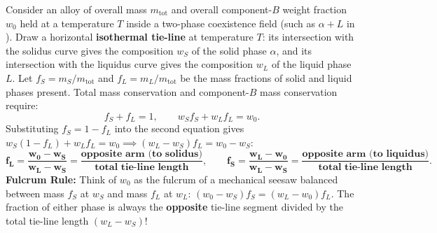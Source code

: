 \begin{derivation}
Consider an alloy of overall mass $m_{\mathrm{tot}}$ and overall component-$B$ weight fraction $w_0$ held at a temperature $T$ inside a two-phase coexistence field (such as $\alpha + L$ in ). Draw a horizontal \textbf{isothermal tie-line} at temperature $T$: its intersection with the solidus curve gives the composition $w_S$ of the solid phase $\alpha$, and its intersection with the liquidus curve gives the composition $w_L$ of the liquid phase $L$. Let $f_S = m_S/m_{\mathrm{tot}}$ and $f_L = m_L/m_{\mathrm{tot}}$ be the mass fractions of solid and liquid phases present. Total mass conservation and component-$B$ mass conservation require:
\begin{equation}\label{eq:05:leverproof}
  f_S + f_L = 1, \qquad w_S f_S + w_L f_L = w_0.
\end{equation}
Substituting $f_S = 1 - f_L$ into the second equation gives $w_S(1 - f_L) + w_L f_L = w_0 \implies (w_L - w_S)f_L = w_0 - w_S$:
\begin{equation}\label{eq:05:eutecticlever}
  \mathbf{f_L = \frac{w_0 - w_S}{w_L - w_S} = \frac{\text{opposite arm (to solidus)}}{\text{total tie-line length}}}, \qquad
  \mathbf{f_S = \frac{w_L - w_0}{w_L - w_S} = \frac{\text{opposite arm (to liquidus)}}{\text{total tie-line length}}}.
\end{equation}
\textbf{Fulcrum Rule:} Think of $w_0$ as the fulcrum of a mechanical seesaw balanced between mass $f_S$ at $w_S$ and mass $f_L$ at $w_L$: $(w_0 - w_S)f_S = (w_L - w_0)f_L$. The fraction of either phase is always the \textbf{opposite} tie-line segment divided by the total tie-line length $(w_L - w_S)$!
\end{derivation}


